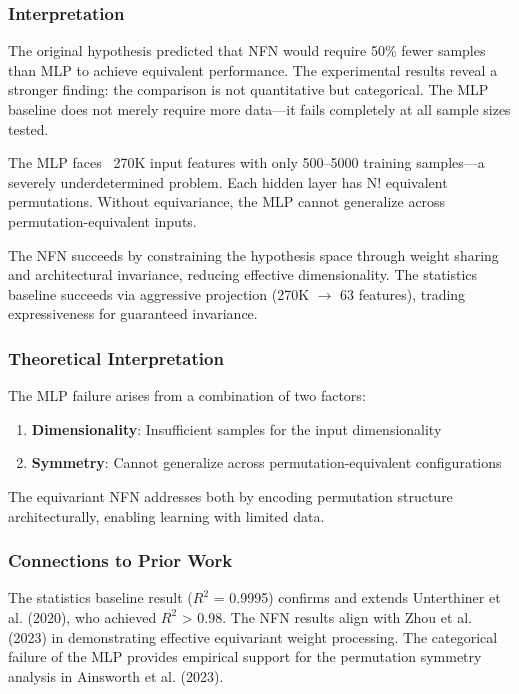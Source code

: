 
\subsubsection{Interpretation}

The original hypothesis predicted that NFN would require 50\% fewer samples than MLP to achieve equivalent performance. The experimental results reveal a stronger finding: the comparison is not quantitative but categorical. The MLP baseline does not merely require more data---it fails completely at all sample sizes tested.

The MLP faces ~270K input features with only 500--5000 training samples---a severely underdetermined problem. Each hidden layer has N! equivalent permutations. Without equivariance, the MLP cannot generalize across permutation-equivalent inputs.

The NFN succeeds by constraining the hypothesis space through weight sharing and architectural invariance, reducing effective dimensionality. The statistics baseline succeeds via aggressive projection (270K $\rightarrow$ 63 features), trading expressiveness for guaranteed invariance.

\subsubsection{Theoretical Interpretation}

The MLP failure arises from a combination of two factors:
\begin{enumerate}
\item \textbf{Dimensionality}: Insufficient samples for the input dimensionality
\item \textbf{Symmetry}: Cannot generalize across permutation-equivalent configurations
\end{enumerate}

The equivariant NFN addresses both by encoding permutation structure architecturally, enabling learning with limited data.

\subsubsection{Connections to Prior Work}

The statistics baseline result ($R^2$ = 0.9995) confirms and extends Unterthiner et al. (2020), who achieved $R^2$ > 0.98. The NFN results align with Zhou et al. (2023) in demonstrating effective equivariant weight processing. The categorical failure of the MLP provides empirical support for the permutation symmetry analysis in Ainsworth et al. (2023).

